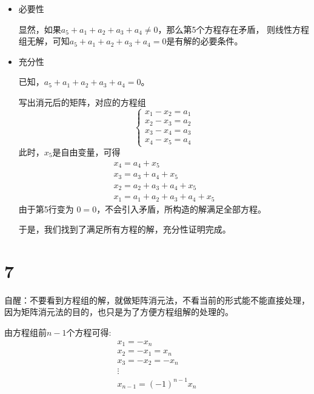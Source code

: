 \documentclass{article}
\begin{document}
\begin{itemize}
  \item 必要性

        显然，如果$a_5 + a_1 + a_2 + a_3 + a_4 \neq 0$，那么第5个方程存在矛盾，
        则线性方程组无解，可知$a_5 + a_1 + a_2 + a_3 + a_4 = 0$是有解的必要条件。

  \item 充分性

        已知，$a_5 + a_1 + a_2 + a_3 + a_4 = 0$。

        写出消元后的矩阵，对应的方程组
        \begin{equation*}
          \begin{cases*}
            x_1 - x_2 = a_1 \\
            x_2 - x_3 = a_2 \\
            x_3 - x_4 = a_3 \\
            x_4 - x_5 = a_4
          \end{cases*}
        \end{equation*}
        此时，$x_5$是自由变量，可得
        \begin{align*}
          x_4 = a_4 + x_5             \\
          x_3 = a_3 + a_4 + x_5       \\
          x_2 = a_2 + a_3 + a_4 + x_5 \\
          x_1 = a_1 + a_2 + a_3 + a_4 + x_5
        \end{align*}
        由于第5行变为 $0 = 0$，不会引入矛盾，所构造的解满足全部方程。

        于是，我们找到了满足所有方程的解，充分性证明完成。
\end{itemize}

\section*{7}

自醒：不要看到方程组的解，就做矩阵消元法，不看当前的形式能不能直接处理，
因为矩阵消元法的目的，也只是为了方便方程组解的处理的。

由方程组前$n - 1$个方程可得:
\begin{align*}
  x_1 = - x_n       \\
  x_2 = -x_1 = x_n  \\
  x_3 = -x_2 = -x_n \\
  \vdots            \\
  x_{n - 1} = (-1)^{n - 1} x_n
\end{align*}
\end{document}
